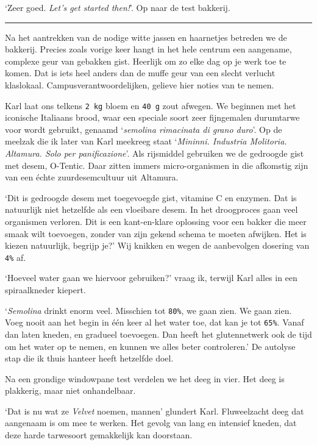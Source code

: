 \documentclass[
  11pt,
  dutch,
]{memoir}
\begin{document}
`Zeer goed. \emph{Let's get started then!}'. Op naar de test bakkerij.

\pfbreak

Na het aantrekken van de nodige witte jassen en haarnetjes betreden we
de bakkerij. Precies zoals vorige keer hangt in het hele centrum een
aangename, complexe geur van gebakken gist. Heerlijk om zo elke dag op
je werk toe te komen. Dat is iets heel anders dan de muffe geur van een
slecht verlucht klaslokaal. Campusverantwoordelijken, gelieve hier
noties van te nemen.

Karl laat ons telkens \texttt{2\ kg} bloem en \texttt{40\ g} zout
afwegen. We beginnen met het iconische Italiaans brood, waar een
speciale soort zeer fijngemalen durumtarwe voor wordt gebruikt, genaamd
`\emph{semolina rimacinata di grano duro}'. Op de meelzak die ik later
van Karl meekreeg staat `\emph{Mininni. Industria Molitoria. Altamura.
Solo per panificazione}'. Als rijsmiddel gebruiken we de gedroogde gist
met desem, O-Tentic. Daar zitten immers micro-organismen in die
afkomstig zijn van een échte zuurdesemcultuur uit Altamura.

`Dit is gedroogde desem met toegevoegde gist, vitamine C en enzymen. Dat
is natuurlijk niet hetzelfde als een vloeibare desem. In het droogproces
gaan veel organismen verloren. Dit is een kant-en-klare oplossing voor
een bakker die meer smaak wilt toevoegen, zonder van zijn gekend schema
te moeten afwijken. Het is kiezen natuurlijk, begrijp je?' Wij knikken
en wegen de aanbevolgen dosering van \texttt{4\%} af.

`Hoeveel water gaan we hiervoor gebruiken?' vraag ik, terwijl Karl alles
in een spiraalkneder kiepert.

`\emph{Semolina} drinkt enorm veel. Misschien tot \texttt{80\%}, we gaan
zien. We gaan zien. Voeg nooit aan het begin in één keer al het water
toe, dat kan je tot \texttt{65\%}. Vanaf dan laten kneden, en gradueel
toevoegen. Dan heeft het glutennetwerk ook de tijd om het water op te
nemen, en kunnen we alles beter controleren.' De autolyse stap die ik
thuis hanteer heeft hetzelfde doel.

Na een grondige windowpane test verdelen we het deeg in vier. Het deeg
is plakkerig, maar niet onhandelbaar.

`Dat is nu wat ze \emph{Velvet} noemen, mannen' glundert Karl.
Fluweelzacht deeg dat aangenaam is om mee te werken. Het gevolg van lang
en intensief kneden, dat deze harde tarwesoort gemakkelijk kan
doorstaan.
\end{document}
